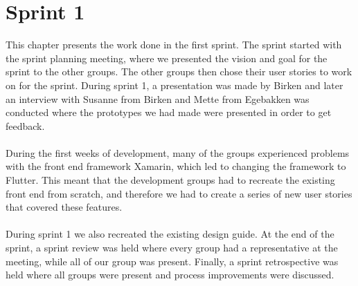 \chapter{Sprint 1}
This chapter presents the work done in the first sprint.
The sprint started with the sprint planning meeting, where we presented the vision and goal for the sprint to the other groups.
The other groups then chose their user stories to work on for the sprint.
During sprint 1, a presentation was made by Birken and later an interview with Susanne from Birken and Mette from Egebakken was conducted where the prototypes we had made were presented in order to get feedback.
\\\\
During the first weeks of development, many of the groups experienced problems with the front end framework Xamarin, which led to changing the framework to Flutter.
This meant that the development groups had to recreate the existing front end from scratch, and therefore we had to create a series of new user stories that covered these features.
\\\\
During sprint 1 we also recreated the existing design guide.
At the end of the sprint, a sprint review was held where every group had a representative at the meeting, while all of our group was present.
Finally, a sprint retrospective was held where all groups were present and process improvements were discussed.
